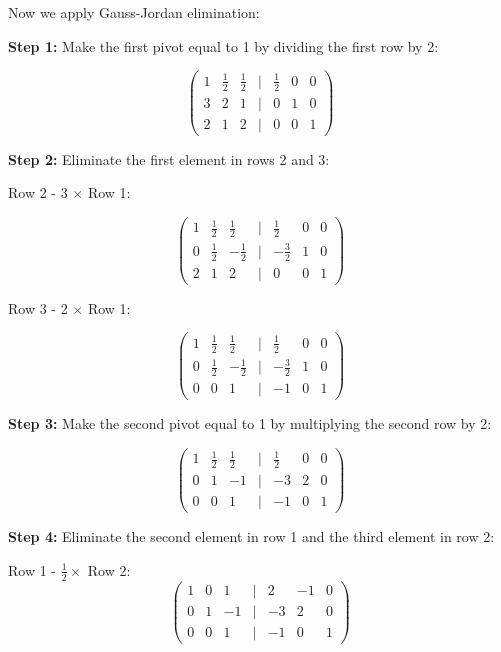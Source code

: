 Now we apply Gauss-Jordan elimination:

\textbf{Step 1:} Make the first pivot equal to 1 by dividing the first row by 2:

\[
    \begin{pmatrix}
    1 & \frac{1}{2} & \frac{1}{2} & | & \frac{1}{2} & 0 & 0 \\
    3 & 2 & 1 & | & 0 & 1 & 0 \\
    2 & 1 & 2 & | & 0 & 0 & 1
    \end{pmatrix}
\]

\textbf{Step 2:} Eliminate the first element in rows 2 and 3:

Row 2 - 3 \(\times\) Row 1:

\[
    \begin{pmatrix}
    1 & \frac{1}{2} & \frac{1}{2} & | & \frac{1}{2} & 0 & 0 \\
    0 & \frac{1}{2} & -\frac{1}{2} & | & -\frac{3}{2} & 1 & 0 \\
    2 & 1 & 2 & | & 0 & 0 & 1
    \end{pmatrix}
\]

Row 3 - 2 \(\times\) Row 1:

\[
    \begin{pmatrix}
    1 & \frac{1}{2} & \frac{1}{2} & | & \frac{1}{2} & 0 & 0 \\
    0 & \frac{1}{2} & -\frac{1}{2} & | & -\frac{3}{2} & 1 & 0 \\
    0 & 0 & 1 & | & -1 & 0 & 1
    \end{pmatrix}
\]

\textbf{Step 3:} Make the second pivot equal to 1 by multiplying the second row by 2:

\[
    \begin{pmatrix}
    1 & \frac{1}{2} & \frac{1}{2} & | & \frac{1}{2} & 0 & 0 \\
    0 & 1 & -1 & | & -3 & 2 & 0 \\
    0 & 0 & 1 & | & -1 & 0 & 1
    \end{pmatrix}
\]

\textbf{Step 4:} Eliminate the second element in row 1 and the third element in row 2:

Row 1 - \(\frac{1}{2} \times\) Row 2:
\[
    \begin{pmatrix}
    1 & 0 & 1 & | & 2 & -1 & 0 \\
    0 & 1 & -1 & | & -3 & 2 & 0 \\
    0 & 0 & 1 & | & -1 & 0 & 1
    \end{pmatrix}
\]

